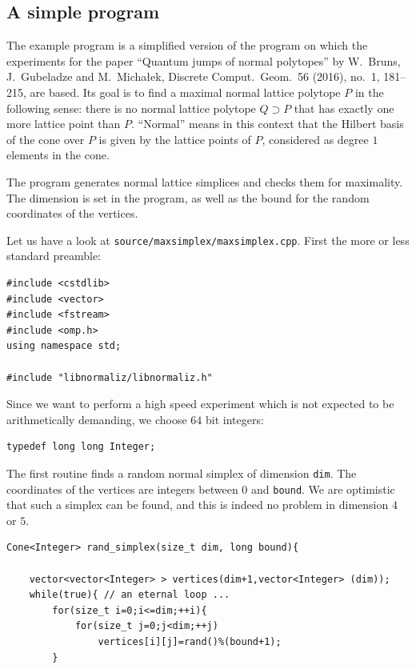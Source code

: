 \begin{small}
\subsection{A simple program}\label{maxsimplex}

The example program is a simplified version of the program on which the experiments for the paper ``Quantum jumps of normal polytopes'' by W.~Bruns, J.~Gubeladze and M.~Micha\l{}ek, Discrete Comput.\ Geom.\ 56 (2016), no.\ 1, 181--215, are based. Its goal is to find a maximal normal lattice polytope $P$ in the following sense: there is no normal lattice polytope $Q\supset P$ that has exactly one more lattice point than $P$. ``Normal'' means in this context that the Hilbert basis of the cone over $P$ is given by the lattice points of $P$, considered as degree $1$ elements in the cone.

The program generates normal lattice simplices and checks them for maximality. The dimension is set in the program, as well as the bound for the random coordinates of the vertices.

Let us have a look at \verb|source/maxsimplex/maxsimplex.cpp|. First the more or less standard preamble:

\begin{Verbatim}
#include <cstdlib>
#include <vector>
#include <fstream>
#include <omp.h>
using namespace std;

#include "libnormaliz/libnormaliz.h"
\end{Verbatim}

Since we want to perform a high speed experiment which is not expected to be arithmetically demanding, we choose $64$ bit integers:
\begin{Verbatim}
typedef long long Integer;
\end{Verbatim}

The first routine finds a random normal simplex of dimension \verb|dim|. The coordinates of the vertices are integers between $0$ and \verb|bound|. We are optimistic that such a simplex can be found, and this is indeed no problem in dimension $4$ or $5$.

\begin{Verbatim}
Cone<Integer> rand_simplex(size_t dim, long bound){

    vector<vector<Integer> > vertices(dim+1,vector<Integer> (dim));
    while(true){ // an eternal loop ...
        for(size_t i=0;i<=dim;++i){
            for(size_t j=0;j<dim;++j)
                vertices[i][j]=rand()%(bound+1);
        }


\end{Verbatim}
\end{small}
